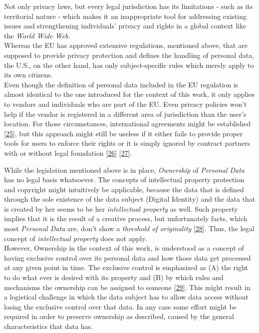 \documentclass[12pt,english,a4paper,titlepage,cleardoublepage=empty,dottedtoc]{report}
\begin{document}
Not only privacy laws, but every legal jurisdiction has its limitations
- such as its territorial nature - which makes it an inappropriate tool
for addressing existing issues and strengthening individuals' privacy
and rights in a global context like the \emph{World Wide Web}.\\
Whereas the EU has approved extensive regulations, mentioned above, that
are supposed to provide privacy protection and defines the handling of
personal data, the U.S., on the other hand, has only subject-specific
rules which merely apply to its own citizens.\\
Even though the definition of personal data included in the EU
regulation is almost identical to the one introduced for the context of
this work, it only applies to vendors and individuals who are part of
the EU. Even privacy policies won't help if the vendor is registered in
a different area of jurisdiction than the user's location. For those
circumstances, international agreements might be established
{[}\protect\hyperlink{ref-web_2016_international-privacy-standards}{25}{]},
but this approach might still be useless if it either fails to provide
proper tools for users to enforce their rights or it is simply ignored
by contract partners with or without legal foundation
{[}\protect\hyperlink{ref-web_2017_privacy-shield_faq}{26}{]}
{[}\protect\hyperlink{ref-web_2017_privacy-shield_kritik}{27}{]}.

While the legislation mentioned above is in place,
\emph{\protect\hypertarget{def--ownership}{}{Ownership}} of
\emph{Personal Data} has no legal basis whatsoever. The concepts of
intellectual property protection and copyright might intuitively be
applicable, because the data that is defined through the sole existence
of the data subject (Digital Identity) and the data that is created by
her seems to be her \emph{intellectual property} as well. Such property
implies that it is the result of a creative process, but unfortunately
facts, which most \emph{Personal Data} are, don't show a \emph{threshold
of originality}
{[}\protect\hyperlink{ref-paper_2014_who-owns-yours-data}{28}{]}. Thus,
the legal concept of \emph{intellectual property} does not apply.\\
However, \protect\hypertarget{def--ownership}{}{Ownership} in the
context of this work, is understood as a concept of having exclusive
control over its personal data and how those data get processed at any
given point in time. The exclusive control is emphasized as (A) the
right to do what ever is desired with its property and (B) by which
rules and mechanisms the ownership can be assigned to someone
{[}\protect\hyperlink{ref-book_1987_private-ownership_definition}{29}{]}.
This might result in a logistical challenge in which the data subject
has to allow data access without losing the exclusive control over that
data. In any case some effort might be required in order to preserve
ownership as described, caused by the general characteristics that data
has.
\end{document}
